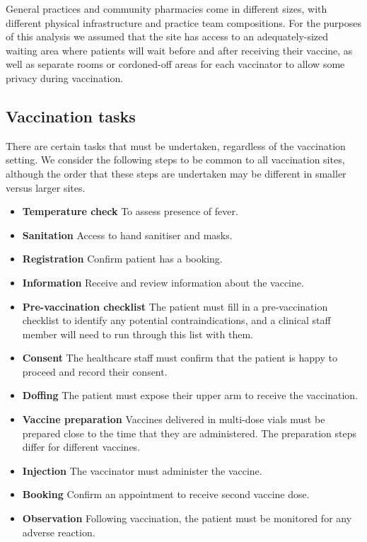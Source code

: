 \documentclass{article}
\begin{document}
General practices and community pharmacies come in different sizes, with
different physical infrastructure and practice team compositions. For
the purposes of this analysis we assumed that the site has access to an
adequately-sized waiting area where patients will wait before and after
receiving their vaccine, as well as separate rooms or cordoned-off areas
for each vaccinator to allow some privacy during vaccination.

\hypertarget{vaccination-tasks}{%
\subsection{Vaccination tasks}\label{vaccination-tasks}}

There are certain tasks that must be undertaken, regardless of the
vaccination setting. We consider the following steps to be common to all
vaccination sites, although the order that these steps are undertaken
may be different in smaller versus larger sites.

\begin{itemize}
\tightlist
\item
  \textbf{Temperature check} To assess presence of fever.
\item
  \textbf{Sanitation} Access to hand sanitiser and masks.
\item
  \textbf{Registration} Confirm patient has a booking.
\item
  \textbf{Information} Receive and review information about the vaccine.
\item
  \textbf{Pre-vaccination checklist} The patient must fill in a
  pre-vaccination checklist to identify any potential contraindications,
  and a clinical staff member will need to run through this list with
  them.
\item
  \textbf{Consent} The healthcare staff must confirm that the patient is
  happy to proceed and record their consent.
\item
  \textbf{Doffing} The patient must expose their upper arm to receive
  the vaccination.
\item
  \textbf{Vaccine preparation} Vaccines delivered in multi-dose vials
  must be prepared close to the time that they are administered. The
  preparation steps differ for different vaccines.
\item
  \textbf{Injection} The vaccinator must administer the vaccine.
\item
  \textbf{Booking} Confirm an appointment to receive second vaccine
  dose.
\item
  \textbf{Observation} Following vaccination, the patient must be
  monitored for any adverse reaction.
\end{itemize}
\end{document}
